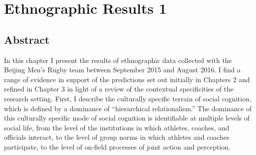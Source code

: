 \chapter{\label{4ethnographicField}Ethnographic Results 1}

\minitoc


\section{Abstract}
In this chapter I present the results of ethnographic data collected with the Beijing Men's Rugby team between September 2015 and August 2016.  I find a range of evidence in support of the predictions set out initially in Chapters 2 and refined in Chapter 3 in light of a review of the contextual specificities of the research setting.  First, I describe the culturally specific terrain of social cognition, which is defined by a dominance of ``hierarchical relationalism.''  The dominance of this culturally specific mode of social cognition is identifiable at multiple levels of social life, from the level of the institutions in which athletes, coaches, and officials interact, to the level of group norms in which athletes and coaches participate, to the level of on-field processes of joint action and perception.

